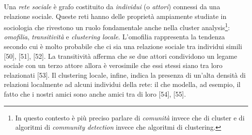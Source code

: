 Una \textit{rete sociale} \`e grafo costituito da \textit{individui} (o \textit{attori}) connessi da una relazione sociale. Queste reti hanno delle propriet\`a ampiamente studiate in sociologia che rivestono un ruolo fondamentale anche nella cluster analysis\footnote{In questo contesto \`e pi\`u preciso parlare di \textit{comunit\`a} invece che di cluster e di algoritmi di \textit{community detection} invece che algoritmi di clustering.}: \textit{omofilia}, \textit{transitivit\`a} e \textit{clustering locale}. L'omofilia rappresenta la tendenza secondo cui \`e molto probabile che ci sia una relazione sociale tra individui simili [50], [51], [52]. La transitivit\`a afferma che se due attori condividono un legame sociale con un terzo attore allora \`e verosimile che essi stessi siano tra loro relazionati [53]. Il clustering locale, infine, indica la presenza di un'alta densit\`a di relazioni localmente ad alcuni individui della rete: il che modella, ad esempio, il fatto che i nostri amici sono anche amici tra di loro [54], [55].

